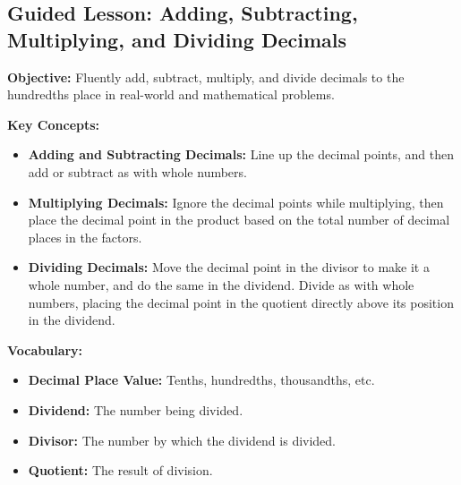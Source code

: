 \documentclass[12pt]{article}
\title{}
\date{}
\begin{document}
\subsection*{Guided Lesson: Adding, Subtracting, Multiplying, and Dividing Decimals}
\onehalfspacing

\begin{tcolorbox}[colframe=black!40, colback=gray!5, 
coltitle=black, colbacktitle=black!20, fonttitle=\bfseries\Large, 
title=Learning Objective, halign title=center, left=5pt, right=5pt, top=5pt, bottom=15pt]
\textbf{Objective:} Fluently add, subtract, multiply, and divide decimals to the hundredths place in real-world and mathematical problems.
\end{tcolorbox}

\vspace{1em}

\begin{tcolorbox}[colframe=black!60, colback=white, 
coltitle=black, colbacktitle=black!15, fonttitle=\bfseries\Large, 
title=Key Concepts and Vocabulary, halign title=center, left=10pt, right=10pt, top=10pt, bottom=15pt]
\textbf{Key Concepts:}
\begin{itemize}
    \item \textbf{Adding and Subtracting Decimals:} Line up the decimal points, and then add or subtract as with whole numbers.
    \item \textbf{Multiplying Decimals:} Ignore the decimal points while multiplying, then place the decimal point in the product based on the total number of decimal places in the factors.
    \item \textbf{Dividing Decimals:} Move the decimal point in the divisor to make it a whole number, and do the same in the dividend. Divide as with whole numbers, placing the decimal point in the quotient directly above its position in the dividend.
\end{itemize}

\textbf{Vocabulary:}
\begin{itemize}
    \item \textbf{Decimal Place Value:} Tenths, hundredths, thousandths, etc.
    \item \textbf{Dividend:} The number being divided.
    \item \textbf{Divisor:} The number by which the dividend is divided.
    \item \textbf{Quotient:} The result of division.
\end{itemize}
\end{tcolorbox}
\end{document}
